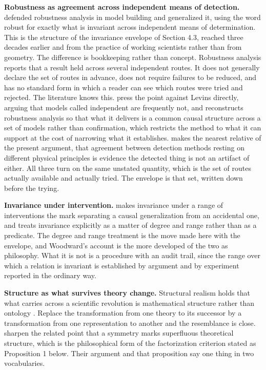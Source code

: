 \documentclass[11pt]{article}
\theoremstyle{remark}
\begin{document}
\textbf{Robustness as agreement across independent means of detection.}
\citet{levins1966} defended robustness analysis in model building and
\citet{wimsatt1981} generalized it, using the word robust for exactly what is
invariant across independent means of determination. This is the structure of the
invariance envelope of Section 4.3, reached three decades earlier and from the
practice of working scientists rather than from geometry. The difference is
bookkeeping rather than concept. Robustness analysis reports that a result held
across several independent routes. It does not generally declare the set of routes
in advance, does not require failures to be reduced, and has no standard form in
which a reader can see which routes were tried and rejected. The literature knows
this. \citet{orzack1993} press the point against Levins directly, arguing that
models called independent are frequently not, and \citet{weisberg2006}
reconstructs robustness analysis so that what it delivers is a common causal
structure across a set of models rather than confirmation, which restricts the
method to what it can support at the cost of narrowing what it establishes. \citet{hacking1983} makes the
nearest relative of the present argument, that agreement between detection methods
resting on different physical principles is evidence the detected thing is not an
artifact of either. All three turn on the same unstated quantity, which is the set
of routes actually available and actually tried. The envelope is that set, written
down before the trying.

\textbf{Invariance under intervention.} \citet{woodward2003} makes invariance under
a range of interventions the mark separating a causal generalization from an
accidental one, and treats invariance explicitly as a matter of degree and range
rather than as a predicate. The degree and range treatment is the move made here
with the envelope, and Woodward's account is the more developed of the two as
philosophy. What it is not is a procedure with an audit trail, since the range over
which a relation is invariant is established by argument and by experiment reported
in the ordinary way.

\textbf{Structure as what survives theory change.} Structural realism holds that
what carries across a scientific revolution is mathematical structure rather than
ontology \citep{worrall1989}. Replace the transformation from one theory to its
successor by a transformation from one representation to another and the
resemblance is close. \citet{ismael2003} sharpen the related point that a symmetry
marks superfluous theoretical structure, which is the philosophical form of the
factorization criterion stated as Proposition 1 below. Their argument and that
proposition say one thing in two vocabularies.
\end{document}

